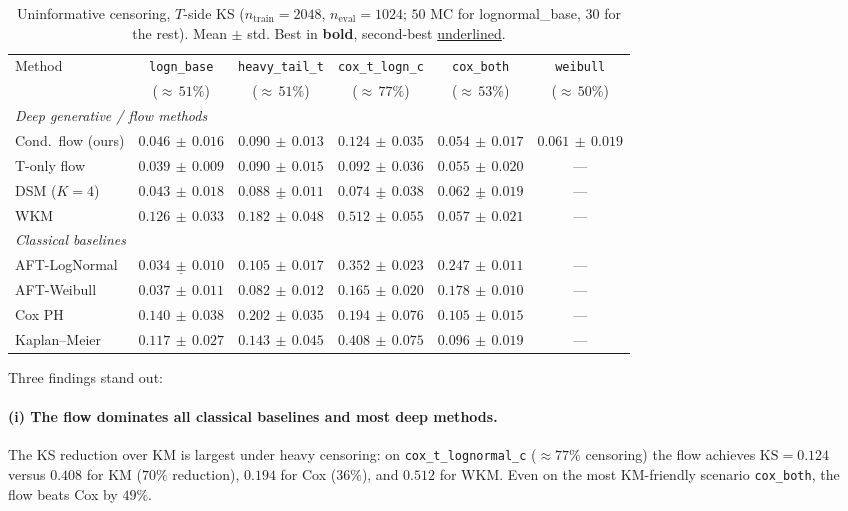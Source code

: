 \begin{table}[t]
\caption{Uninformative censoring, $T$-side KS ($n_{\text{train}} = 2048$,
$n_{\text{eval}} = 1024$; $50$ MC for lognormal\_base, $30$ for the rest).
Mean $\pm$ std. Best in \textbf{bold}, second-best \underline{underlined}.}
\label{tab:uninf-main}
\centering
\small
\begin{tabular}{lccccc}
\toprule
Method & \texttt{logn\_base} & \texttt{heavy\_tail\_t} & \texttt{cox\_t\_logn\_c} & \texttt{cox\_both} & \texttt{weibull}\\
& (${\approx}\,51\%$) & (${\approx}\,51\%$) & (${\approx}\,77\%$) & (${\approx}\,53\%$) & (${\approx}\,50\%$) \\
\midrule
\multicolumn{6}{l}{\emph{Deep generative / flow methods}} \\
Cond.\ flow (ours) & $0.046\,{\pm}\,0.016$ & $\mathbf{0.090\,{\pm}\,0.013}$ & $0.124\,{\pm}\,0.035$ & $\mathbf{0.054\,{\pm}\,0.017}$ & $\mathbf{0.061\,{\pm}\,0.019}$ \\
T-only flow        & $\mathbf{0.039\,{\pm}\,0.009}$ & $0.090\,{\pm}\,0.015$ & $\mathbf{0.092\,{\pm}\,0.036}$ & $0.055\,{\pm}\,0.020$ & --- \\
DSM ($K{=}4$)       & $0.043\,{\pm}\,0.018$ & $\underline{0.088\,{\pm}\,0.011}$ & $\underline{0.074\,{\pm}\,0.038}$ & $\underline{0.062\,{\pm}\,0.019}$ & --- \\
WKM                 & $0.126\,{\pm}\,0.033$ & $0.182\,{\pm}\,0.048$ & $0.512\,{\pm}\,0.055$ & $0.057\,{\pm}\,0.021$ & --- \\
\midrule
\multicolumn{6}{l}{\emph{Classical baselines}} \\
AFT-LogNormal       & $\underline{0.034\,{\pm}\,0.010}$ & $0.105\,{\pm}\,0.017$ & $0.352\,{\pm}\,0.023$ & $0.247\,{\pm}\,0.011$ & --- \\
AFT-Weibull         & $0.037\,{\pm}\,0.011$ & $0.082\,{\pm}\,0.012$ & $0.165\,{\pm}\,0.020$ & $0.178\,{\pm}\,0.010$ & --- \\
Cox PH              & $0.140\,{\pm}\,0.038$ & $0.202\,{\pm}\,0.035$ & $0.194\,{\pm}\,0.076$ & $0.105\,{\pm}\,0.015$ & --- \\
Kaplan--Meier       & $0.117\,{\pm}\,0.027$ & $0.143\,{\pm}\,0.045$ & $0.408\,{\pm}\,0.075$ & $0.096\,{\pm}\,0.019$ & --- \\
\bottomrule
\end{tabular}
\end{table}

Three findings stand out:

\paragraph{(i) The flow dominates all classical baselines and most deep
methods.}
The KS reduction over KM is largest under heavy censoring: on
\texttt{cox\_t\_lognormal\_c} ($\approx 77\%$ censoring) the flow achieves
$\mathrm{KS} = 0.124$ versus $0.408$ for KM ($70\%$ reduction),
$0.194$ for Cox ($36\%$), and $0.512$ for WKM. Even on the most
KM-friendly scenario \texttt{cox\_both}, the flow beats Cox by $49\%$.

